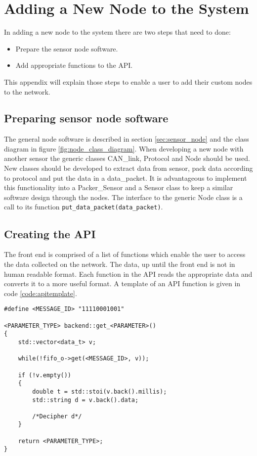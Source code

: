 \section{Adding a New Node to the System}
\label{app:addnode}
In adding a new node to the system there are two steps that need to done:
\begin{itemize}
	\item Prepare the sensor node software.
	\item Add appropriate functions to the API.
\end{itemize}
This appendix will explain those steps to enable a user to add their custom nodes to the network.

\subsection{Preparing sensor node software}\label{sec:node_implementation_guide}
The general node software is described in section \ref{sec:sensor_node} and the class diagram in figure \ref{fig:node_class_diagram}.
When developing a new node with another sensor the generic classes CAN\_link, Protocol and Node should be used. 
New classes should be developed to extract data from sensor, pack data according to protocol and put the data in a data\_packet.
It is advantageous to implement this functionality into a Packer\_Sensor and a Sensor class to keep a similar software design through the nodes.
The interface to the generic Node class is a call to its function \texttt{put\_data\_packet(data\_packet)}.

\subsection{Creating the API}
The front end is comprised of a list of functions which enable the user to access the data collected on the network.
The data, up until the front end is not in human readable format.
Each function in the API reads the appropriate data and converts it to a more useful format.
A template of an API function is given in code \ref{code:apitemplate}.

\begin{lstlisting}[caption=Function template for accesing data,label=code:apitemplate]
#define <MESSAGE_ID> "11110001001"

<PARAMETER_TYPE> backend::get_<PARAMETER>()
{
	std::vector<data_t> v;

	while(!fifo_o->get(<MESSAGE_ID>, v));

	if (!v.empty())
	{
		double t = std::stoi(v.back().millis);
		std::string d = v.back().data;

		/*Decipher d*/		
	}

	return <PARAMETER_TYPE>;
}
\end{lstlisting}

